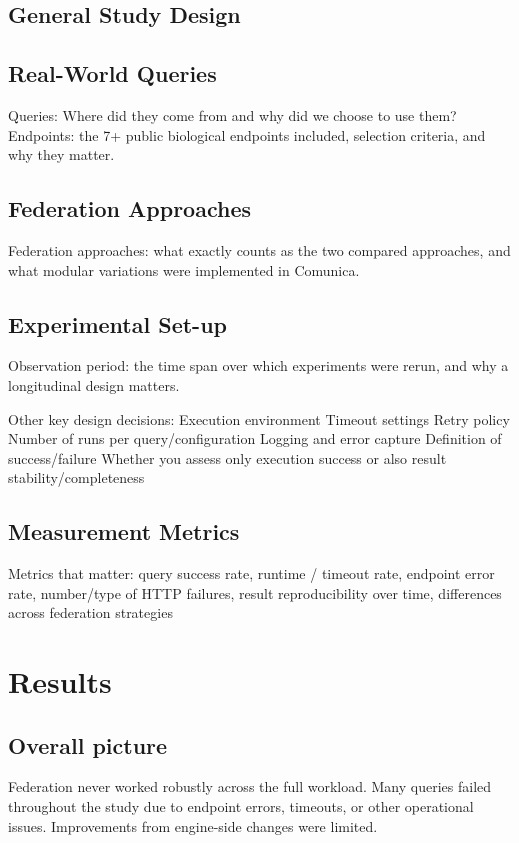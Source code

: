 \documentclass[runningheads]{llncs}
\begin{document}
\subsection{General Study Design}\label{sec3.1}

\subsection{Real-World Queries}\label{sec3.2}
Queries: Where did they come from and why did we choose to use them?
Endpoints: the 7+ public biological endpoints included, selection criteria, and why they matter.

\subsection{Federation Approaches}\label{sec3.3}
Federation approaches: what exactly counts as the two compared approaches, and what modular variations were implemented in Comunica.

\subsection{Experimental Set-up}\label{sec3.4}
Observation period: the time span over which experiments were rerun, and why a longitudinal design matters.

Other key design decisions:
Execution environment
Timeout settings
Retry policy
Number of runs per query/configuration
Logging and error capture
Definition of success/failure
Whether you assess only execution success or also result stability/completeness

\subsection{Measurement Metrics}
Metrics that matter: query success rate, runtime / timeout rate, endpoint error rate, number/type of HTTP failures, result reproducibility over time, differences across federation strategies


\section{Results}\label{sec4}
\subsection{Overall picture}\label{sec4.1}
Federation never worked robustly across the full workload.
Many queries failed throughout the study due to endpoint errors, timeouts, or other operational issues.
Improvements from engine-side changes were limited.
\end{document}

